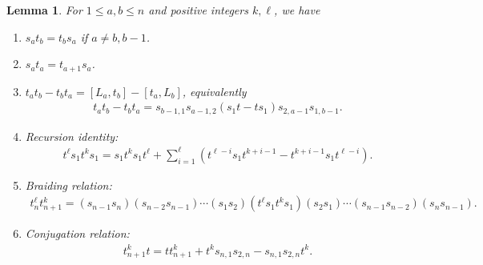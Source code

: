\documentclass[a4paper, oneside]{amsart}
\numberwithin{equation}{section}
\newtheorem{lemma}[equation]{Lemma}
\theoremstyle{definition}
\theoremstyle{remark}
\begin{document}
\begin{lemma}\label{Lemm:s-t}For $1\leq a,b\leq n$ and  positive integers $k,\ell$, we have
  \begin{enumerate}
    \item[(i)] $s_at_b=t_bs_a$ if $a\neq b, b-1$.
    \item[(ii)] $s_at_a=t_{a+1}s_a$.
    \item[(iii)]$t_at_b-t_bt_a=[L_a,t_b]-[t_a,L_b]$, equivalently
    \begin{align*}
t_{a}t_b-t_bt_a=s_{b-1,1}s_{a-1,2}(s_1t-ts_1)s_{2,a-1}s_{1,b-1}.\end{align*}
\item[(iv)] Recursion identity:
\begin{align*}t^{\ell}s_1t^ks_1=s_1t^ks_1t^{\ell}+\displaystyle\sum_{i=1}^{\ell}
    (t^{\ell-i}s_1t^{k+i-1}-t^{k+i-1}s_1t^{\ell-i}).\end{align*}

\item[(v)] Braiding relation:  \begin{align*}t_{n}^{\ell}t_{n+1}^k=(s_{n-1}s_n)(s_{n-2}s_{n-1})\cdots(s_1s_2)
(t^{\ell}s_1t^ks_1)(s_2s_1)\cdots(s_{n-1}s_{n-2})(s_ns_{n-1}).\end{align*}

\item[(vi)]Conjugation relation:
\begin{align*}t_{n+1}^kt=tt_{n+1}^k+t^ks_{n,1}s_{2,n}-s_{n,1}s_{2,n}t^k.\end{align*}
  \end{enumerate}
\end{lemma}
\end{document}
